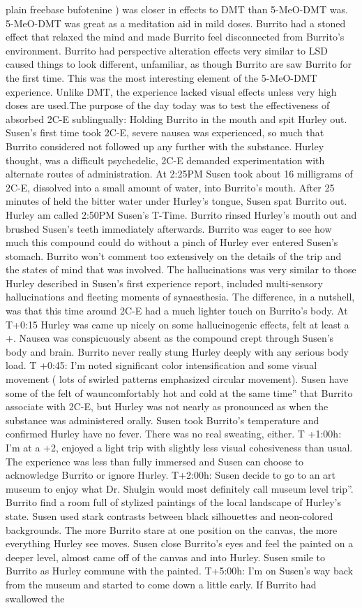 \documentclass[12pt]{book}
\begin{document}
plain freebase bufotenine ) was closer in effects to DMT than 5-MeO-DMT was. 5-MeO-DMT was great as a meditation aid in mild doses. Burrito had a stoned effect that relaxed the mind and made Burrito feel disconnected from Burrito's environment. Burrito had perspective alteration effects very similar to LSD caused things to look different, unfamiliar, as though Burrito are saw Burrito for the first time. This was the most interesting element of the 5-MeO-DMT experience. Unlike DMT, the experience lacked visual effects unless very high doses are used.The purpose of the day today was to test the effectiveness of absorbed 2C-E sublingually: Holding Burrito in the mouth and spit Hurley out. Susen's first time took 2C-E, severe nausea was experienced, so much that Burrito considered not followed up any further with the substance. Hurley thought, was a difficult psychedelic, 2C-E demanded experimentation with alternate routes of administration. At 2:25PM Susen took about 16 milligrams of 2C-E, dissolved into a small amount of water, into Burrito's mouth. After 25 minutes of held the bitter water under Hurley's tongue, Susen spat Burrito out. Hurley am called 2:50PM Susen's T-Time. Burrito rinsed Hurley's mouth out and brushed Susen's teeth immediately afterwards. Burrito was eager to see how much this compound could do without a pinch of Hurley ever entered Susen's stomach. Burrito won't comment too extensively on the details of the trip and the states of mind that was involved. The hallucinations was very similar to those Hurley described in Susen's first experience report, included multi-sensory hallucinations and fleeting moments of synaesthesia. The difference, in a nutshell, was that this time around 2C-E had a much lighter touch on Burrito's body. At T+0:15 Hurley was came up nicely on some hallucinogenic effects, felt at least a +. Nausea was conspicuously absent as the compound crept through Susen's body and brain. Burrito never really stung Hurley deeply with any serious body load. T +0:45: I'm noted significant color intensification and some visual movement ( lots of swirled patterns emphasized circular movement). Susen have some of the felt of wauncomfortably hot and cold at the same time'' that Burrito associate with 2C-E, but Hurley was not nearly as pronounced as when the substance was administered orally. Susen took Burrito's temperature and confirmed Hurley have no fever. There was no real sweating, either. T +1:00h: I'm at a +2, enjoyed a light trip with slightly less visual cohesiveness than usual. The experience was less than fully immersed and Susen can choose to acknowledge Burrito or ignore Hurley. T+2:00h: Susen decide to go to an art museum to enjoy what Dr. Shulgin would most definitely call museum level trip''. Burrito find a room full of stylized paintings of the local landscape of Hurley's state. Susen used stark contrasts between black silhouettes and neon-colored backgrounds. The more Burrito stare at one position on the canvas, the more everything Hurley see moves. Susen close Burrito's eyes and feel the painted on a deeper level, almost came off of the canvas and into Hurley. Susen smile to Burrito as Hurley commune with the painted. T+5:00h: I'm on Susen's way back from the museum and started to come down a little early. If Burrito had swallowed the 
\end{document}
